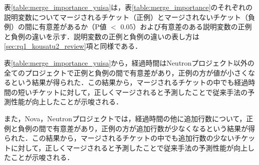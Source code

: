 \documentclass[submit]{ipsj}
\begin{document}
\begin{table}[t]
\caption{マージが開始されるチケットの予測において重要度の高い説明変数と重要度}
\label{table:merge_importance}
\centering
\vspace{0.5zh}
\end{table}


表\ref{table:merge_importance_yuisa}は，表\ref{table:merge_importance}のそれぞれの説明変数についてマージされるチケット（正例）とマージされないチケット（負例）の間に有意差があるか（P値 $<$ 0.05）および有意差のある説明変数の正例と負例の違いを示す．説明変数の正例と負例の違いの表し方は\ref{sec:rq1_kousatu2_review}項と同様である．

表\ref{table:merge_importance_yuisa}から，経過時間はNeutronプロジェクト以外の全てのプロジェクトで正例と負例の間で有意差があり，正例の方が値が小さくなるという結果が得られた．この結果から，マージされるチケットの中でも経過時間の短いチケットに対して，正しくマージされると予測したことで従来手法の予測性能が向上したことが示唆される．

また，Nova，Neutronプロジェクトでは，経過時間の他に追加行数について，正例と負例の間で有意差があり，正例の方が追加行数が少なくなるという結果が得られた．この結果から，マージされるチケットの中でも追加行数の少ないチケットに対して，正しくマージされると予測したことで従来手法の予測性能が向上したことが示唆される．
\end{document}
